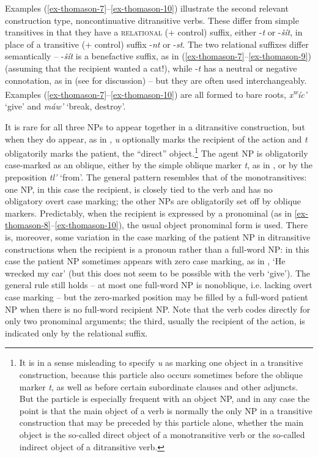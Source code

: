 \documentclass[output=paper,colorlinks,citecolor=brown]{langscibook}
\begin{document}
Examples (\ref{ex-thomason-7}--\ref{ex-thomason-10}) illustrate the second relevant construction type,
noncontinuative ditransitive verbs.  These differ from simple
transitives in that they have a \textsc{relational} (+ control) suffix,
either -\emph{{\textltilde}t} or -\emph{\v{s}\'it}, in place of a
transitive (+ control) suffix -\emph{nt} or -\emph{st}.  The two
relational suffixes differ semantically -- -\emph{\v{s}\'it} is a
benefactive suffix, as in (\ref{ex-thomason-7}--\ref{ex-thomason-9}) (assuming that the recipient wanted a
cat!), while -\emph{{\textltilde}t} has a neutral or negative
connotation, as in  (see \citealt{Carlson:1980} for discussion) -- but they
are often used interchangeably.  Examples (\ref{ex-thomason-7}--\ref{ex-thomason-10}) are all formed to bare
roots, \emph{{x\textsuperscript w}\'ic'} `give' and \emph{m\'aw'}
`break, destroy'.


  It is rare for all three NPs to appear together in a ditransitive
  construction, but when they do appear, as in , \emph{{\textltilde}u} optionally marks the recipient of the action and
  \emph{t} obligatorily marks the patient, the ``direct''
  object.\footnote{It is in a sense misleading to specify \emph{{\textltilde}u} as marking one object in a transitive
  construction, because this particle also occurs sometimes before
  the oblique marker \emph{t}, as well as before certain subordinate
  clauses and other adjuncts.  But the particle is especially
  frequent with an object NP, and in any case the point is that the
  main object of a verb is normally the only NP in a transitive
  construction that may be preceded by this particle alone, whether
  the main object is the so-called direct object of a monotransitive
  verb or the so-called indirect object of a ditransitive verb.  }
  The agent NP is obligatorily case-marked as an oblique, either by
  the simple oblique marker \emph{t}, as in , or by the preposition
  \emph{tl'} `from'.  The general pattern resembles that of the
  monotransitives: one NP, in this case the recipient, is closely
  tied to the verb and has no obligatory overt case marking; the
  other NPs are obligatorily set off by oblique markers.
  Predictably, when the recipient is expressed by a pronominal (as in
  \ref{ex-thomason-8}--\ref{ex-thomason-10}), the usual object pronominal form is used.  There is,
  moreover, some variation in the case marking of the patient NP in
  ditransitive constructions when the recipient is a pronoun rather
  than a full-word NP: in this case the patient NP sometimes appears
  with zero case marking, as in , `He wrecked my car' (but this
  does not seem to be possible with the verb `give').  The general
  rule still holds -- at most one full-word NP is nonoblique, i.e.
  lacking overt case marking -- but the zero-marked position may be
  filled by a full-word patient NP when there is no full-word
  recipient NP.  Note that the verb codes directly for only two
  pronominal arguments; the third, usually the recipient of the
  action, is indicated only by the relational suffix.
\end{document}
